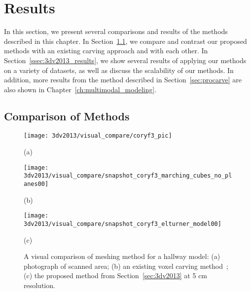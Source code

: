 \documentclass[12pt,onecolumn,oneside]{book}
\begin{document}
\section{Results}
\label{sec:carving_results}

In this section, we present several comparisons and results of the methods described in this chapter.  In Section~\ref{ssec:compare_3dv2013_procarve}, we compare and contrast our proposed methods with an existing carving approach and with each other.  In Section~\ref{ssec:3dv2013_results}, we show several results of applying our methods on a variety of datasets, as well as discuss the scalability of our methods.  In addition, more results from the method described in Section~\ref{sec:procarve} are also shown in Chapter~\ref{ch:multimodal_modeling}.

\subsection{Comparison of Methods}
\label{ssec:compare_3dv2013_procarve}

\begin{figure}
	
	\centering
	\begin{minipage}[b]{0.27\linewidth}
	\centerline{\texttt{[image: 3dv2013/visual\_compare/coryf3\_pic]}}
	\centerline{(a)}\medskip
	\end{minipage}
	\hfill
	\begin{minipage}[b]{0.35\linewidth}
	\centerline{\texttt{[image: 3dv2013/visual\_compare/snapshot\_coryf3\_marching\_cubes\_no\_planes00]}}
	\centerline{(b)}\medskip
	\end{minipage}
	\hfill
	\begin{minipage}[b]{0.35\linewidth}
	\centerline{\texttt{[image: 3dv2013/visual\_compare/snapshot\_coryf3\_elturner\_model00]}}
	\centerline{(c)}\medskip
	\end{minipage}

	\caption[Comparison between voxel carving methods.]{A visual comparison of meshing method for a hallway model:  (a) photograph of scanned area; (b) an existing voxel carving method~\cite{Carving}; (c) the proposed method from Section~\ref{sec:3dv2013} at 5 cm resolution.}
	\label{fig:mc_compare}

\end{figure}
\end{document}
